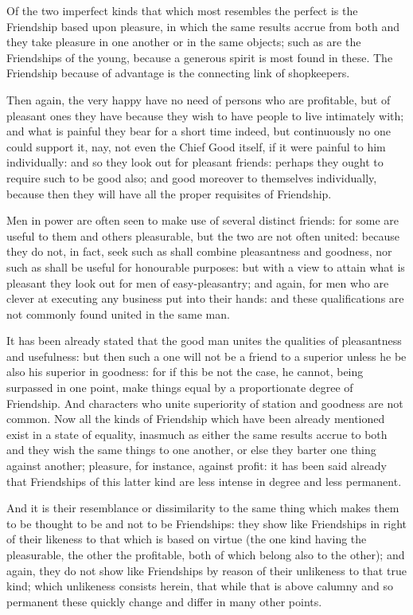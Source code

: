 Of the two imperfect kinds that which most resembles the perfect is the
Friendship based upon pleasure, in which the same results accrue from
both and they take pleasure in one another or in the same objects; such
as are the Friendships of the young, because a generous spirit is most
found in these. The Friendship because of advantage is the connecting
link of shopkeepers.

Then again, the very happy have no need of persons who are profitable,
but of pleasant ones they have because they wish to have people to live
intimately with; and what is painful they bear for a short time indeed,
but continuously no one could support it, nay, not even the Chief Good
itself, if it were painful to him individually: and so they look out for
pleasant friends: perhaps they ought to require such to be good also;
and good moreover to themselves individually, because then they will
have all the proper requisites of Friendship.

Men in power are often seen to make use of several distinct friends:
for some are useful to them and others pleasurable, but the two are not
often united: because they do not, in fact, seek such as shall combine
pleasantness and goodness, nor such as shall be useful for honourable
purposes: but with a view to attain what is pleasant they look out for
men of easy-pleasantry; and again, for men who are clever at executing
any business put into their hands: and these qualifications are not
commonly found united in the same man.

It has been already stated that the good man unites the qualities of
pleasantness and usefulness: but then such a one will not be a friend to
a superior unless he be also his superior in goodness: for if this be
not the case, he cannot, being surpassed in one point, make things
equal by a proportionate degree of Friendship. And characters who unite
superiority of station and goodness are not common. Now all the kinds
of Friendship which have been already mentioned exist in a state of
equality, inasmuch as either the same results accrue to both and they
wish the same things to one another, or else they barter one thing
against another; pleasure, for instance, against profit: it has been
said already that Friendships of this latter kind are less intense in
degree and less permanent.

And it is their resemblance or dissimilarity to the same thing which
makes them to be thought to be and not to be Friendships: they show like
Friendships in right of their likeness to that which is based on virtue
(the one kind having the pleasurable, the other the profitable, both
of which belong also to the other); and again, they do not show like
Friendships by reason of their unlikeness to that true kind; which
unlikeness consists herein, that while that is above calumny and so
permanent these quickly change and differ in many other points.


